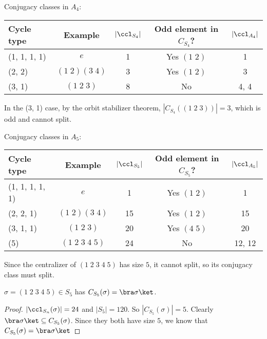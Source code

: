 \documentclass[a4paper]{article}
\begin{document}
\begin{eg}
  Conjugacy classes in $A_4$:
  \begin{center}
    \begin{tabular}{lcccc}
      \toprule
      Cycle type & Example & $|\ccl_{S_4}|$ & Odd element in $C_{S_4}$? & $|\ccl_{A_4}|$ \\
      \midrule
      (1, 1, 1, 1) & $e$ & 1 & Yes $(1\; 2)$ & 1 \\
      (2, 2) & $(1\; 2)(3\; 4)$ & 3 & Yes $(1\; 2)$ & 3 \\
      (3, 1) & $(1\; 2\; 3)$ & 8 & No & 4, 4 \\
      \bottomrule
    \end{tabular}
  \end{center}
  In the (3, 1) case, by the orbit stabilizer theorem, $|C_{S_4}((1\; 2\; 3))| = 3$, which is odd and cannot split.
\end{eg}

\begin{eg}
  Conjugacy classes in $A_5$:
  \begin{center}
    \begin{tabular}{lcccc}
      \toprule
      Cycle type & Example & $|\ccl_{S_5}|$ & Odd element in $C_{S_5}$? & $|\ccl_{A_5}|$ \\
      \midrule
      (1, 1, 1, 1, 1) & $e$ & 1 & Yes $(1\; 2)$ & 1 \\
      (2, 2, 1) & $(1\; 2)(3\; 4)$ & 15 & Yes $(1\; 2)$ & 15 \\
      (3, 1, 1) & $(1\; 2\; 3)$ & 20 & Yes $(4\; 5)$ & 20 \\
      (5) & $(1\; 2\; 3\; 4\; 5)$ & 24 & No & 12, 12 \\
      \bottomrule
    \end{tabular}
  \end{center}
  Since the centralizer of $(1\; 2\; 3\; 4\; 5)$ has size $5$, it cannot split, so its conjugacy class must split.
\end{eg}

\begin{lemma}
  $\sigma = (1\; 2\; 3\; 4\; 5)\in S_5$ has $C_{S_5}(\sigma) = \bra \sigma \ket$. \end{lemma}

\begin{proof}
  $|\ccl_{S_n}(\sigma)| = 24$ and $|S_5| = 120$. So $|C_{S_5}(\sigma)| = 5$. Clearly $\bra \sigma \ket \subseteq C_{S_5}(\sigma)$. Since they both have size $5$, we know that $C_{S_5}(\sigma) = \bra \sigma\ket$
\end{proof}
\end{document}
